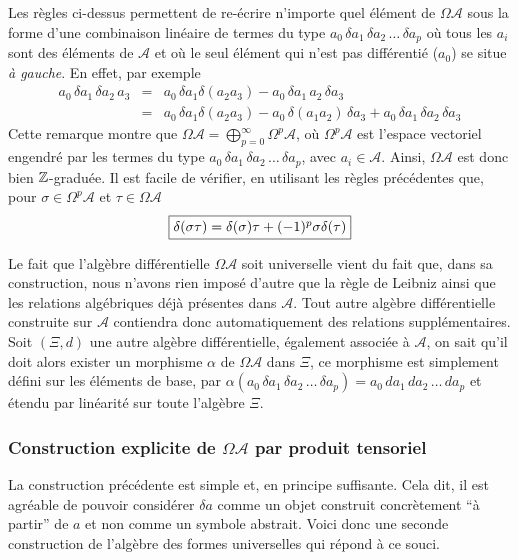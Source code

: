 	Les r\`egles ci-dessus permettent de re-\'ecrire n'importe quel \'el\'ement 
	de $\Omega{\mathcal A}$ sous la forme d'une combinaison lin\'eaire de 
	termes du type $a_{0} \, \delta a_{1} \,  \delta a_{2} \, \ldots \,  
	\delta a_{p}$ o\`u tous les $a_{i}$ sont des \'el\'ements de ${\mathcal A}$ 
	et o\`u le seul \'el\'ement qui n'est pas diff\'erenti\'e ($a_{0}$) se 
	situe {\it \`a gauche}. En effet, par exemple 
	\begin{eqnarray*}
	a_{0} \, \delta a_{1} \, \delta a_{2} \, a_{3} & = &
	a_{0} \, \delta a_{1} \delta (a_{2}a_{3}) - a_{0}\, \delta a_{1}\, 
	a_{2} \, \delta a_{3} \\
	{} & = & 
		a_{0} \, \delta a_{1} \delta (a_{2}a_{3}) - a_{0}\, \delta 
		(a_{1}a_{2}) \, \delta	a_{3} +
		  a_{0} \, \delta a_{1} \, \delta a_{2} \, \delta a_{3}
    \end{eqnarray*}
    Cette remarque montre que $\Omega{\mathcal A} = 
    \bigoplus_{p=0}^{\infty} \Omega^p{\mathcal A}$, o\`u $\Omega^p{\mathcal A}$ est 
    l'espace vectoriel engendr\'e par les termes du type 
    $a_{0} \, \delta a_{1} \,  \delta a_{2} \, \ldots \, 	\delta 
    a_{p}$, avec $a_{i}\in {\mathcal A}$. Ainsi, $\Omega{\mathcal A}$ est 
    donc bien $\mathbb{Z}$-gradu\'ee. Il est facile de v\'erifier, en utilisant 
    les r\`egles pr\'ec\'edentes que, pour $\sigma \in \Omega^p{\mathcal 
    A}$ et $\tau \in \Omega{\mathcal A}$
    $$
    \mbox{\fbox{$
     \delta (\sigma \tau) = \delta(\sigma) \tau + (-1)^p \sigma 
    \delta(\tau)
    $}}
    $$
    
    Le fait que l'alg\`ebre diff\'erentielle $\Omega{\mathcal A}$ soit 
    universelle vient du fait que, dans sa construction, nous n'avons 
    rien impos\'e d'autre que la r\`egle de Leibniz ainsi que les relations 
    alg\'ebriques d\'ej\`a pr\'esentes dans $\mathcal A$. Tout autre alg\`ebre 
    diff\'erentielle construite sur $\mathcal A$ contiendra donc 
    automatiquement des relations suppl\'ementaires. Soit $(\Xi, d)$ 
    une autre alg\`ebre diff\'erentielle, \'egalement associ\'ee \`a ${\mathcal 
    A}$, on sait qu'il doit alors exister un morphisme $\alpha$ de 
    $\Omega{\mathcal A}$ dans $\Xi$, ce morphisme est simplement 
    d\'efini sur les \'el\'ements de base, par
     $\alpha( a_{0} \, \delta a_{1} \,  \delta a_{2} \, \ldots \,  
	\delta a_{p}) = a_{0} \, d a_{1} \,  d a_{2} \, \ldots \,  
	d a_{p} $ et \'etendu par lin\'earit\'e sur toute l'alg\`ebre $\Xi$.
	
	\subsubsection{Construction explicite de $\Omega{\mathcal A}$ par produit 
	tensoriel}  La construction pr\'ec\'edente est simple et, en principe 
	suffisante. Cela dit, il est agr\'eable de pouvoir consid\'erer $\delta 
	a$ comme un objet construit concr\`etement  ``\`a partir'' de $a$ et non comme un 
	symbole abstrait. Voici donc une seconde construction de l'alg\`ebre 
	des formes universelles qui r\'epond \`a ce souci.
	
